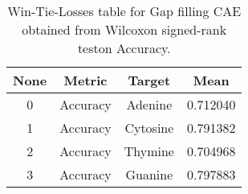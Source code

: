 \begin{table}[H]
\centering
\begin{tabular}{|c|c|c|c|}

 \textbf{None} & \textbf{Metric} & \textbf{Target} &  \textbf{Mean} \\
\hline

             0 &        Accuracy &         Adenine &       0.712040 \\
\hline
             1 &        Accuracy &        Cytosine &       0.791382 \\
\hline
             2 &        Accuracy &         Thymine &       0.704968 \\
\hline
             3 &        Accuracy &         Guanine &       0.797883 \\
\hline

\end{tabular}
\caption{Win-Tie-Losses table for Gap filling CAE obtained from Wilcoxon signed-rank teston Accuracy.}
\label{tab:gap_filling_cae_nucleotides_means}
\end{table}